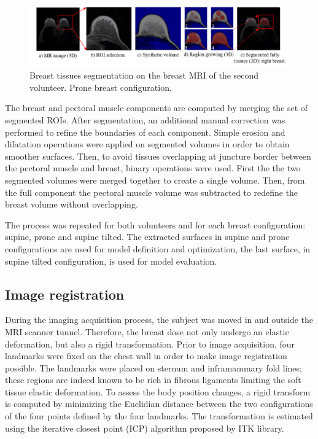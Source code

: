  
 \begin{figure}[h]
\centering
\includegraphics[width=1\textwidth,keepaspectratio]{figures/tissues_segmentation.png} 
\caption{Breast tissues segmentation on the breast MRI of the second volunteer. Prone breast configuration.} \label{fig:breasttissuessegmentation}
\end{figure}

The breast and pectoral muscle components are computed by merging the set of segmented ROIs. After segmentation, an additional manual correction was performed to refine the boundaries of each component. Simple erosion and dilatation operations were applied on segmented volumes in order to obtain smoother surfaces. Then, to avoid tissues overlapping at juncture border between the pectoral muscle and breast, binary operations were used. First the the two segmented volumes were merged together to create a single volume. Then, from the full component the pectoral muscle volume was subtracted to redefine the breast volume without overlapping.
 
The process was repeated for both volunteers and for each breast configuration: supine, prone and supine tilted. The extracted surfaces in supine and prone configurations are used for model definition and optimization,  the last surface, in supine tilted configuration, is used for model evaluation. 

\subsection{Image registration}\label{subsection:image registration}

During the imaging acquisition process, the subject was moved in and outside the MRI scanner tunnel. Therefore, the breast dose not only undergo an elastic deformation, but also a rigid transformation. Prior to image acquisition, four landmarks were fixed on the chest wall in order to make image registration possible.  The landmarks were placed on sternum and inframammary fold lines; these regions are indeed known to be rich in fibrous ligaments limiting the soft tissue elastic deformation.  To assess the body position changes, a rigid transform is computed by minimizing the Euclidian distance between the two configurations of the four points defined by the four landmarks. The transformation is estimated using the iterative closest point (ICP) algorithm proposed by ITK library.

